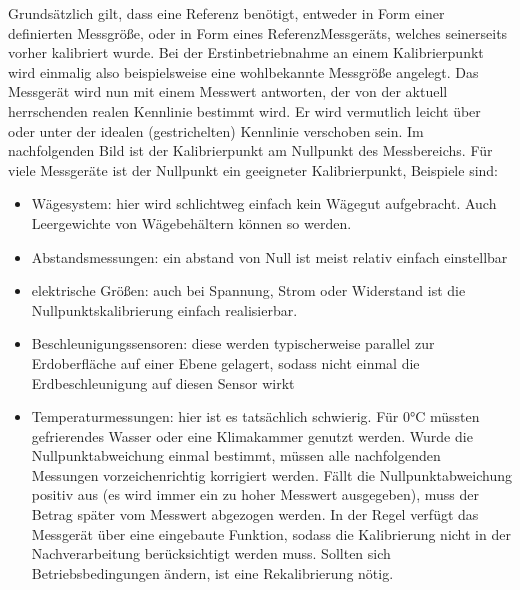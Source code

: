 \documentclass[letterpaper,10pt,english]{jupyterBook}
\begin{document}
\sphinxAtStartPar
Grundsätzlich gilt, dass eine Referenz benötigt, entweder in Form einer definierten Messgröße, oder in Form eines Referenz\sphinxhyphen{}Messgeräts, welches seinerseits vorher kalibriert wurde. Bei der Erstinbetriebnahme an einem Kalibrierpunkt wird einmalig also beispielsweise eine wohlbekannte Messgröße angelegt. Das Messgerät wird nun mit einem Messwert antworten, der von der aktuell herrschenden realen Kennlinie bestimmt wird. Er wird vermutlich leicht über oder unter der idealen (gestrichelten) Kennlinie verschoben sein. Im nachfolgenden Bild ist der Kalibrierpunkt am Nullpunkt des Messbereichs. Für viele Messgeräte ist der Nullpunkt ein geeigneter Kalibrierpunkt, Beispiele sind:
\begin{itemize}
\item {} 
\sphinxAtStartPar
Wägesystem: hier wird schlichtweg einfach kein Wägegut aufgebracht. Auch Leergewichte von Wägebehältern können so  werden.

\item {} 
\sphinxAtStartPar
Abstandsmessungen: ein abstand von Null ist meist relativ einfach einstellbar

\item {} 
\sphinxAtStartPar
elektrische Größen: auch bei Spannung, Strom oder Widerstand ist die Nullpunktskalibrierung einfach realisierbar.

\item {} 
\sphinxAtStartPar
Beschleunigungssensoren: diese werden typischerweise parallel zur Erdoberfläche auf einer Ebene gelagert, sodass nicht einmal die Erdbeschleunigung auf diesen Sensor wirkt

\item {} 
\sphinxAtStartPar
Temperaturmessungen: hier ist es tatsächlich schwierig. Für 0°C müssten gefrierendes Wasser oder eine Klimakammer genutzt werden.
Wurde die Nullpunktabweichung einmal bestimmt, müssen alle nachfolgenden Messungen vorzeichenrichtig korrigiert werden. Fällt die Nullpunktabweichung positiv aus (es wird immer ein zu hoher Messwert ausgegeben), muss der Betrag später vom Messwert abgezogen werden. In der Regel verfügt das Messgerät über eine eingebaute Funktion, sodass die Kalibrierung nicht in der Nachverarbeitung berücksichtigt werden muss. Sollten sich Betriebsbedingungen ändern, ist eine Rekalibrierung nötig.

\end{itemize}
\end{document}
